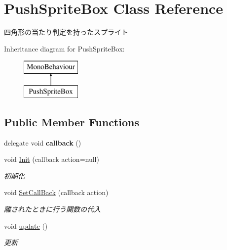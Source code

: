 \hypertarget{class_push_sprite_box}{}\section{Push\+Sprite\+Box Class Reference}
\label{class_push_sprite_box}


四角形の当たり判定を持ったスプライト  


Inheritance diagram for Push\+Sprite\+Box\+:\begin{figure}[H]
\begin{center}
\leavevmode
\includegraphics[height=2.000000cm]{class_push_sprite_box}
\end{center}
\end{figure}
\subsection*{Public Member Functions}
\begin{DoxyCompactItemize}
\item 
delegate void {\bfseries callback} ()\hypertarget{class_push_sprite_box_a3a2b1a81646210d8252c3a22cd0db4cb}{}\label{class_push_sprite_box_a3a2b1a81646210d8252c3a22cd0db4cb}

\item 
void \hyperlink{class_push_sprite_box_a9b11701a1b0d48f87ad0cf4b0a21f24f}{Init} (callback action=null)
\begin{DoxyCompactList}\small\item\em 初期化 \end{DoxyCompactList}\item 
void \hyperlink{class_push_sprite_box_abd97fb6c92c989a809df9e56b35cc249}{Set\+Call\+Back} (callback action)
\begin{DoxyCompactList}\small\item\em 離されたときに行う関数の代入 \end{DoxyCompactList}\item 
void \hyperlink{class_push_sprite_box_aa8766cf11790ecdd85a01eecb74171b0}{update} ()
\begin{DoxyCompactList}\small\item\em 更新 \end{DoxyCompactList}\end{DoxyCompactItemize}


